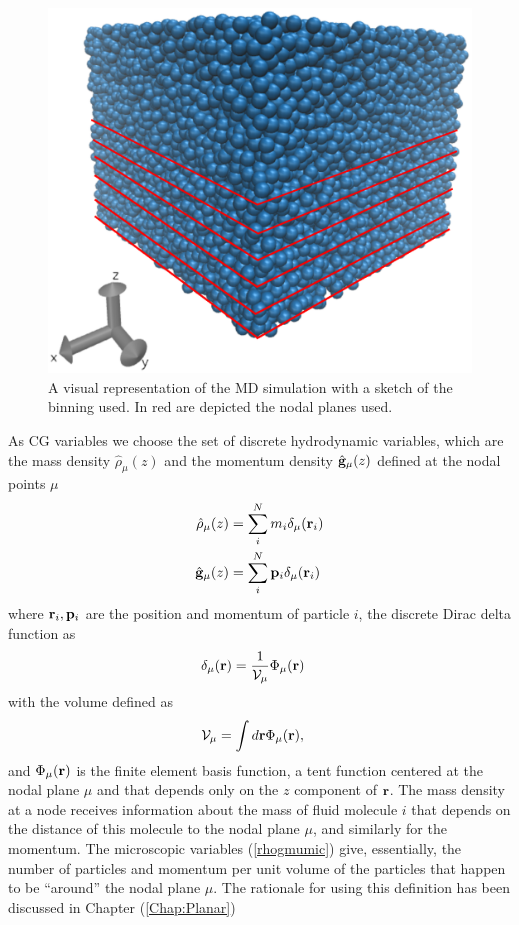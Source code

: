 \documentclass[a4paper,openright,12pt]{book}
\begin{document}
\begin{figure}
    \centering
    \includegraphics[scale=0.3]{system_nodes_periodic}
    \caption[Periodic box]{A visual representation of the MD simulation with a sketch of the binning used. In red are depicted the nodal planes used.}
    \label{fig:PBCBox}
\end{figure}

As CG variables we choose  the set of discrete hydrodynamic
variables,  which are  the  mass density  $\hat{\rho}_\mu(z)$ and  the
momentum  density $\hat{\bf  g}_\mu(z)$  defined at  the nodal  points
$\mu$
\begin{align}
\hat{\rho}_\mu(z)&= \sum_i^Nm_i\delta_\mu({\bf r}_i)
\nonumber\\
\hat{\bf g}_\mu(z)&= \sum_i^N{\bf p}_i\delta_\mu({\bf r}_i)
\label{rhogmumic}
\end{align}
where ${\bf r}_i,{\bf p}_i$ are the position and momentum of particle $i$, 
 the discrete Dirac delta function as 
\begin{align}
\delta_\mu({\bf r})&=  \frac{1}{{\cal V}_\mu}\Phi_\mu({\bf r})
\label{delta}
\end{align}
with the volume defined as
\begin{align}
  {\cal V}_\mu&=\int d{\bf r}\Phi_\mu({\bf r}),
\end{align}
and $\Phi_\mu({\bf r})$  is the finite element basis  function, a tent
function centered  at the nodal plane  $\mu$ and that depends  only on
the $z$ component  of ${\bf r}$.  The mass density  at a node receives
information about the  mass of fluid molecule $i$ that  depends on the
distance of this molecule to the  nodal plane $\mu$, and similarly for
the  momentum.   The  microscopic  variables  (\ref{rhogmumic})  give,
essentially, the number  of particles and momentum per  unit volume of
the particles that happen to be ``around'' the nodal plane $\mu$.  The rationale for using this definition has been discussed in Chapter (\ref{Chap:Planar})
\end{document}
